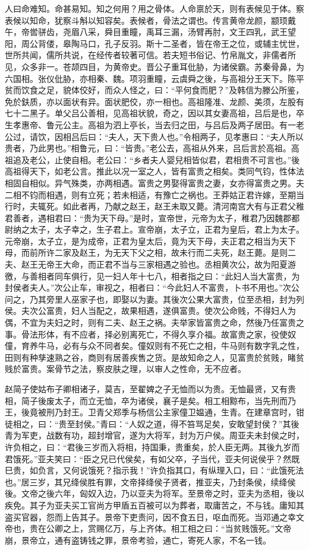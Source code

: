 \documentclass[]{article}
\begin{document}
人曰命难知。命甚易知。知之何用？用之骨体。人命禀於天，则有表候见于体。察表候以知命，犹察斗斛以知容矣。表候者，骨法之谓也。传言黄帝龙颜，颛顼戴午，帝喾骈齿，尧眉八采，舜目重瞳，禹耳三漏，汤臂再肘，文王四乳，武王望阳，周公背偻，皋陶马口，孔子反羽。斯十二圣者，皆在帝王之位，或辅主忧世，世所共闻，儒所共说，在经传者较著可信。若夫短书俗记、竹帛胤文，非儒者所见，众多非一。苍颉四目，为黄帝史。晋公子重耳仳胁，为诸侯霸。苏秦骨鼻，为六国相。张仪仳胁，亦相秦、魏。项羽重瞳，云虞舜之後，与高祖分王天下。陈平贫而饮食之足，貌体佼好，而众人怪之，曰：``平何食而肥？''及韩信为滕公所鉴，免於鈇质，亦以面状有异。面状肥佼，亦一相也。高祖隆准、龙颜、美须，左股有七十二黑子。单父吕公善相，见高祖状貌，奇之，因以其女妻高祖，吕后是也，卒生孝惠帝、鲁元公主。高祖为泗上亭长，当去归之田，与吕后及两子居田。有一老公过，请饮，因相吕后曰：``夫人，天下贵人也。''令相两子，见孝惠曰：``夫人所以贵者，乃此男也。''相鲁元，曰：``皆贵。''老公去，高祖从外来，吕后言於高祖。高祖追及老公，止使自相。老公曰：``乡者夫人婴兒相皆似君，君相贵不可言也。''後高祖得天下，如老公言。推此以况一室之人，皆有富贵之相矣。类同气钧，性体法相固自相似。异气殊类，亦两相遇。富贵之男娶得富贵之妻，女亦得富贵之男。夫二相不钧而相遇，则有立死；若未相适，有豫亡之祸也。王莽姑正君许嫁，至期当行时，夫辄死。如此者再，乃献之赵王，赵王未取又薨。清河南宫大有与正君父稚君善者，遇相君曰：``贵为天下母。''是时，宣帝世，元帝为太子，稚君乃因魏郡都尉纳之太子，太子幸之，生子君上。宣帝崩，太子立，正君为皇后，君上为太子。元帝崩，太子立，是为成帝，正君为皇太后，竟为天下母，夫正君之相当为天下母，而前所许二家及赵王，为无天下父之相，故未行而二夫死，赵王薨。是则二夫、赵王无帝王大命，而正君不当与三家相遇之验也。丞相黄次公，故为阳夏游徼，与善相者同车俱行，见一妇人年十七八，相者指之曰：``此妇人当大富贵，为封侯者夫人。''次公止车，审视之，相者曰：``今此妇人不富贵，卜书不用也。''次公问之，乃其旁里人巫家子也，即娶以为妻。其後次公果大富贵，位至丞相，封为列侯。夫次公富贵，妇人当配之，故果相遇，遂俱富贵。使次公命贱，不得妇人为偶，不宜为夫妇之时，则有二夫、赵王之祸。夫举家皆富贵之命，然後乃任富贵之事。骨法形体，有不应者，择必别离死亡，不得久享介福。故富贵之家，役使奴僮，育养牛马，必有与众不同者矣。僮奴则有不死亡之相，牛马则有数字乳之性，田则有种孳速熟之谷，商则有居善疾售之货。是故知命之人，见富贵於贫贱，睹贫贱於富贵。案骨节之法，察皮肤之理，以审人之性命，无不应者。

赵简子使姑布子卿相诸子，莫吉，至翟婢之子无恤而以为贵。无恤最贤，又有贵相，简子後废太子，而立无恤，卒为诸侯，襄子是矣。相工相黥布，当先刑而乃王，後竟被刑乃封王。卫青父郑季与杨信公主家僮卫媪通，生青。在建章宫时，钳徒相之，曰：``贵至封侯。''青曰：``人奴之道，得不笞骂足矣，安敢望封侯？''其後青为军吏，战数有功，超封增官，遂为大将军，封为万户侯。周亚夫未封侯之时，许负相之，曰：``君後三岁而入将相，持国秉，贵重矣，於人臣无两。其後九岁而君饿死。''亚夫笑曰：``臣之兄已代侯矣，有如父卒，子当代，亚夫何说侯乎？然既巳贵，如负言，又何说饿死？指示我！''许负指其口，有纵理入口，曰：``此饿死法也。''居三岁，其兄绛侯胜有罪，文帝择绛侯子贤者，推亚夫，乃封条侯，续绛侯後。文帝之後六年，匈奴入边，乃以亚夫为将军。至景帝之时，亚夫为丞相，後以疾免。其子为亚夫买工官尚方甲盾五百被可以为葬者，取庸苦之，不与钱。庸知其盗买官器，怨而上告其子。景帝下吏责问，因不食五日，呕血而死。当邓通之幸文帝也，贵在公卿之上，赏赐亿万，与上齐体。相工相之曰：``当贫贱饿死。''文帝崩，景帝立，通有盗铸钱之罪，景帝考验，通亡，寄死人家，不名一钱。
\end{document}
